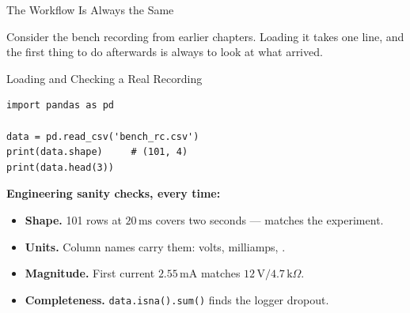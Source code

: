 \documentclass[9pt,aspectratio=169,xcolor=table]{beamer}
\begin{document}
\begin{frame}{The Workflow Is Always the Same}
    \leavevmode
    \begin{center}
    \end{center}

    \vspace{4mm}
    Consider the bench recording from earlier chapters. Loading it
    takes one line, and the first thing to do afterwards is always to
    \alert{look at what arrived}.
\end{frame}

\begin{frame}[fragile]{Loading and Checking a Real Recording}
    \leavevmode
\begin{lstlisting}
import pandas as pd

data = pd.read_csv('bench_rc.csv')
print(data.shape)     # (101, 4)
print(data.head(3))
\end{lstlisting}

    \vspace{2mm}
    \textbf{Engineering sanity checks, every time:}
    \begin{itemize}\small
        \item \textbf{Shape.} 101 rows at $20\,\text{ms}$ covers two
              seconds --- matches the experiment.
        \item \textbf{Units.} Column names carry them: volts,
              milliamps, \textcelsius.
        \item \textbf{Magnitude.} First current $2.55\,\text{mA}$
              matches $12\,\text{V}/4.7\,\text{k}\Omega$.
        \item \textbf{Completeness.} \texttt{data.isna().sum()} finds
              the logger dropout.
    \end{itemize}
\end{frame}
\end{document}

